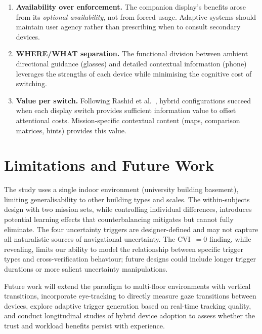 \documentclass[review]{vgtc}           %
\begin{document}
\begin{enumerate}
\item \textbf{Availability over enforcement.} The companion display's
benefits arose from its \emph{optional availability}, not from forced
usage. Adaptive systems should maintain user agency rather than
prescribing when to consult secondary devices.

\item \textbf{WHERE/WHAT separation.} The functional division between
ambient directional guidance (glasses) and detailed contextual
information (phone) leverages the strengths of each device while
minimising the cognitive cost of switching.

\item \textbf{Value per switch.} Following Rashid et
al.~\cite{Rashid:2012:CDS}, hybrid configurations succeed when each
display switch provides sufficient information value to offset
attentional costs. Mission-specific contextual content (maps,
comparison matrices, hints) provides this value.
\end{enumerate}



\section{Limitations and Future Work}

The study uses a single indoor environment (university building
basement), limiting generalisability to other building types and
scales. The within-subjects design with two mission sets, while
controlling individual differences, introduces potential learning
effects that counterbalancing mitigates but cannot fully eliminate.
The four uncertainty triggers are designer-defined and may not capture
all naturalistic sources of navigational uncertainty. The CVI~$= 0$
finding, while revealing, limits our ability to model the relationship
between specific trigger types and cross-verification behaviour;
future designs could include longer trigger durations or more salient
uncertainty manipulations.

Future work will extend the paradigm to multi-floor environments with
vertical transitions, incorporate eye-tracking to directly measure
gaze transitions between devices, explore adaptive trigger generation
based on real-time tracking quality, and conduct longitudinal studies
of hybrid device adoption to assess whether the trust and workload
benefits persist with experience.
\end{document}
